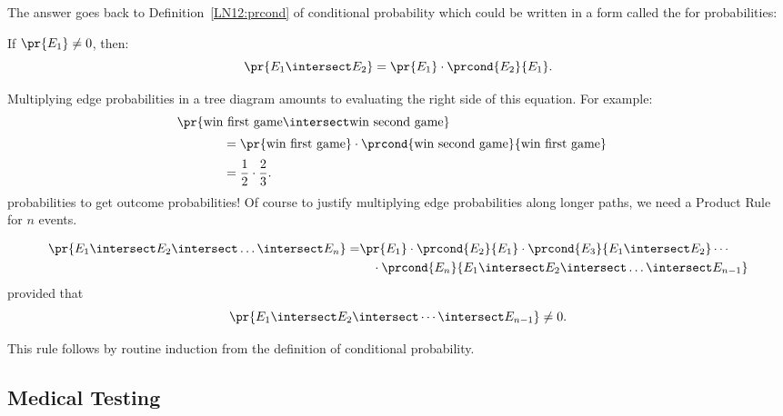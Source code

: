 The answer goes back to Definition~\ref{LN12:prcond} of conditional probability
which could be written in a form called the  for
probabilities:
%
\begin{rul*}
If $\pr{E_1} \neq 0$, then:
%
\[
    \pr{E_1 \intersect E_2} = \pr{E_1} \cdot \prcond{E_2}{E_1}.
\]
\end{rul*}
%
Multiplying edge probabilities in a tree diagram amounts to evaluating
the right side of this equation.  For example:
%
\begin{align*}
\lefteqn{\pr{\text{win first game} \intersect \text{win second game}}}
		\hspace{0.5in} \\[2pt]
	& = \pr{\text{win first game}} \cdot
            \prcond{\text{win second game}}{\text{win first game}} \\[2pt]
	& = \frac{1}{2} \cdot \frac{2}{3}.
\end{align*}
probabilities to get outcome probabilities!  Of course to justify
multiplying edge probabilities along longer paths, we need a Product
Rule for $n$ events.

\begin{rul*}
\begin{align*}
\pr{E_1 \intersect E_2 \intersect \dots \intersect E_n}
   =& \pr{E_1}
        \cdot \prcond{E_2}{E_1}
        \cdot \prcond{E_3}{E_1 \intersect E_2}
        \cdots \\
    &\quad\cdot
        \prcond{E_n}{E_1 \intersect E_2 \intersect \dots
          \intersect E_{n - 1}}
\end{align*}
provided that
\begin{equation*}
    \pr{E_1 \intersect E_2 \intersect \cdots \intersect E_{n - 1}}
    \neq 0.
\end{equation*}
\end{rul*}
This rule follows by routine induction from the definition of
conditional probability.

\subsection{Medical Testing}\label{med_test-subsection}

